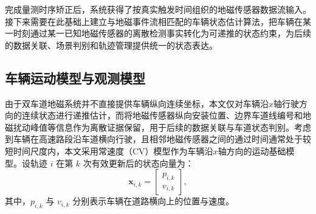 \documentclass{xdupgthesis}
\begin{document}
完成量测时序矫正后，系统获得了按真实触发时间组织的地磁传感器数据流输入。接下来需要在此基础上建立与地磁事件流相匹配的车辆状态估计算法，把车辆在某一时刻通过某一已知地磁传感器的离散检测事实转化为可递推的状态约束，为后续的数据关联、场景判别和轨迹管理提供统一的状态表达。


\subsection{车辆运动模型与观测模型}

由于双车道地磁系统并不直接提供车辆纵向连续坐标，本文仅对车辆沿$x$轴行驶方向的连续状态进行递推估计，而将地磁传感器纵向安装位置、边界车道线编号和地磁扰动峰值等信息作为离散证据保留，用于后续的数据关联与车道状态判别。考虑到车辆在高速路段沿车道横向行驶，且相邻地磁传感器之间的通过时间通常处于较短时间尺度内，本文采用常速度（CV）模型作为车辆沿$x$轴方向的运动基础模型。设轨迹 $i$ 在第 $k$ 次有效更新后的状态向量为：
\begin{equation}
	\mathbf x_{i,k}=
	\begin{bmatrix}
		p_{i,k}\\
		v_{i,k}
	\end{bmatrix},
	\label{eq:ch3_state_vec}
\end{equation}
其中，$p_{i,k}$ 与 $v_{i,k}$ 分别表示车辆在道路横向上的位置与速度。
\end{document}
